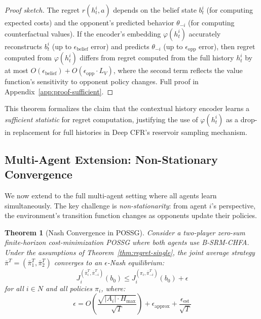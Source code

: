 \documentclass{article}
\newtheorem{theorem}{Theorem}[section]
\begin{document}
\begin{proof}[Proof sketch]
The regret $r(h_t^i, a)$ depends on the belief state $b_t^i$ (for computing expected costs) and the opponent's predicted behavior $\theta_{-i}$ (for computing counterfactual values). If the encoder's embedding $\varphi(h_t^i)$ accurately reconstructs $b_t^i$ (up to $\epsilon_{\text{belief}}$ error) and predicts $\theta_{-i}$ (up to $\epsilon_{\text{opp}}$ error), then regret computed from $\varphi(h_t^i)$ differs from regret computed from the full history $h_t^i$ by at most $O(\epsilon_{\text{belief}}) + O(\epsilon_{\text{opp}} \cdot L_V)$, where the second term reflects the value function's sensitivity to opponent policy changes. Full proof in Appendix~\ref{app:proof-sufficient}.
\end{proof}

This theorem formalizes the claim that the contextual history encoder learns a \emph{sufficient statistic} for regret computation, justifying the use of $\varphi(h_t^i)$ as a drop-in replacement for full histories in Deep CFR's reservoir sampling mechanism.

\subsection{Multi-Agent Extension: Non-Stationary Convergence}
\label{sec:theory-multi}

We now extend to the full multi-agent setting where all agents learn simultaneously. The key challenge is \emph{non-stationarity}: from agent $i$'s perspective, the environment's transition function changes as opponents update their policies.

\begin{theorem}[Nash Convergence in POSSG]
\label{thm:nash}
Consider a two-player zero-sum finite-horizon cost-minimization POSSG where both agents use B-SRM-CHFA. Under the assumptions of Theorem~\ref{thm:regret-single}, the joint average strategy $\bar{\pi}^T = (\bar{\pi}_1^T, \bar{\pi}_2^T)$ converges to an $\epsilon$-Nash equilibrium:
\begin{equation}
J_i^{(\bar{\pi}_i^T, \bar{\pi}_{-i}^T)}(b_0) \leq J_i^{(\pi_i, \bar{\pi}_{-i}^T)}(b_0) + \epsilon
\end{equation}
for all $i \in N$ and all policies $\pi_i$, where:
\begin{equation}
\epsilon = O\left(\frac{\sqrt{|A_i| \cdot H_{\max}}}{\sqrt{T}}\right) + \epsilon_{\text{approx}} + \frac{\epsilon_{\text{est}}}{\sqrt{T}}
\end{equation}
\end{theorem}
\end{document}
